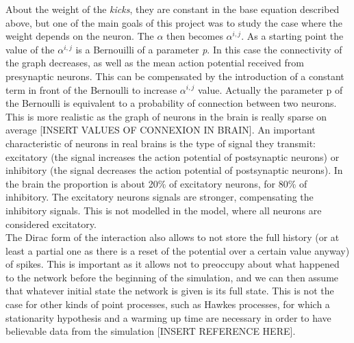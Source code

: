 	About the weight of the \emph{kicks}, they are constant in the base equation described above, but one of the main goals of this project was to study the case where the weight depends on the neuron. The $\alpha$ then becomes $\alpha^{i,j}$. As a starting point the value of the $\alpha^{i,j}$ is a Bernouilli of a parameter \emph{p}. In this case the connectivity of the graph decreases, as well as the mean action potential received from presynaptic neurons. This can be compensated by the introduction of a constant term in front of the Bernoulli to increase $\alpha^{i,j}$ value.
	Actually the parameter p of the Bernoulli is equivalent to a probability of connection between two neurons. This is more realistic as the graph of neurons in the brain is really sparse on average [INSERT VALUES OF CONNEXION IN BRAIN]. An important characteristic of neurons in real brains is the type of signal they transmit: excitatory (the signal increases the action potential of postsynaptic neurons) or inhibitory (the signal decreases the action potential of postsynaptic neurons). In the brain the proportion is about 20\% of excitatory neurons, for 80\% of inhibitory. The excitatory neurons signals are stronger, compensating the inhibitory signals. This is not modelled in the model, where all neurons are considered excitatory.\\
	The Dirac form of the interaction also allows to not store the full history (or at least a partial one as there is a reset of the potential over a certain value anyway) of spikes. This is important as it allows not to preoccupy about what happened to the network before the beginning of the simulation, and we can then assume that whatever initial state the network is given is its full state. This is not the case for other kinds of point processes, such as Hawkes processes, for which a stationarity hypothesis and a warming up time are necessary in order to have believable data from the simulation [INSERT REFERENCE HERE].\\

